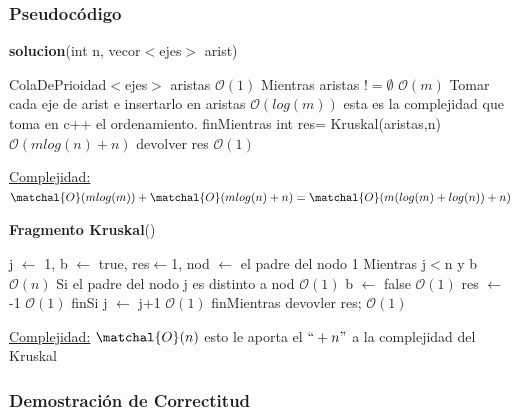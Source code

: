 \documentclass[spanish,12pt]{article}
\begin{document}
\subsubsection{Pseudocódigo}

\begin{algorithm}[H]{\textbf{solucion}(int n, vecor$<$ejes$>$ arist)}
	\begin{algorithmic}[1]
		\State \quad ColaDePrioidad$<$ejes$>$ aristas \Comment $\mathcal{O}(1)$
		\State \quad Mientras aristas $!= \emptyset $ \Comment $\mathcal{O}(m)$
		\State \qquad Tomar cada eje de arist e insertarlo en aristas \Comment $\mathcal{O}(log(m))$ esta es la complejidad que toma en c++ el ordenamiento.
		\State \quad finMientras
		\State \quad int res= Kruskal(aristas,n)  \Comment $\mathcal{O}(mlog(n) + n)$
		\State \quad devolver res \Comment $\mathcal{O}(1)$

	\medskip
        \Statex \underline{Complejidad:} $\matchal{O}(mlog(m)) + \matchal{O}(mlog(n)+n) = \matchal{O}(m(log(m)+log(n))+n)$
	\end{algorithmic}
\end{algorithm}

\begin{algorithm}[H]{\textbf{Fragmento Kruskal}()}
	\begin{algorithmic}[1]
		\State \quad j $\gets$ 1, b $\gets$ true, res$\gets$1, nod $\gets$ el padre del nodo 1
		\State \quad Mientras j$<$n y b \comment   $\mathcal{O}(n)$
		\State \qquad Si el padre del nodo j es distinto a nod  \Comment $\mathcal{O}(1)$
		\State \qquad \quad b $\gets$ false  \Comment $\mathcal{O}(1)$
		\State \qquad \quad res $\gets$ -1 \Comment $\mathcal{O}(1)$
		\State \qquad finSi
		\State \qquad j $\gets$ j+1 \Comment $\mathcal{O}(1)$
		\State \quad finMientras 
		\State \quad devovler res; \Comment $\mathcal{O}(1)$
		
	\medskip
        \Statex \underline{Complejidad:} $\matchal{O}(n)$ esto le aporta el $``+n "$ a la complejidad del Kruskal 
	\end{algorithmic}
\end{algorithm}

\subsubsection{Demostración de Correctitud}
\end{document}
